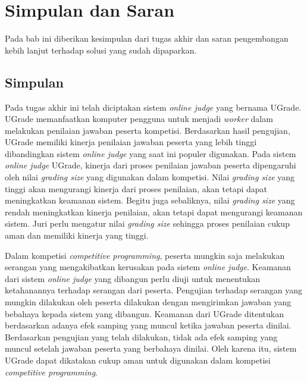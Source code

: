 \chapter{Simpulan dan Saran}


\par Pada bab ini diberikan kesimpulan dari tugas akhir dan saran pengembangan kebih lanjut terhadap solusi yang sudah dipaparkan.

\section{Simpulan}


\par Pada tugas akhir ini telah diciptakan sistem \textit{online judge} yang bernama UGrade. UGrade memanfaatkan komputer pengguna untuk menjadi \textit{worker} dalam melakukan penilaian jawaban peserta kompetisi. Berdasarkan hasil pengujian, UGrade memiliki kinerja penilaian jawaban peserta yang lebih tinggi dibandingkan sistem \textit{online judge} yang saat ini populer digunakan. Pada sistem \textit{online judge} UGrade, kinerja dari proses penilaian jawaban peserta dipengaruhi oleh nilai \textit{grading size} yang digunakan dalam kompetisi. Nilai \textit{grading size} yang tinggi akan mengurangi kinerja dari proses penilaian, akan tetapi dapat meningkatkan keamanan sistem. Begitu juga sebaliknya, nilai \textit{grading size} yang rendah meningkatkan kinerja penilaian, akan tetapi dapat mengurangi keamanan sistem. Juri perlu mengatur nilai \textit{grading size} sehingga proses penilaian cukup aman dan memiliki kinerja yang tinggi.

\par Dalam kompetisi \textit{competitive programming}, peserta mungkin saja melakukan serangan yang mengakibatkan kerusakan pada sistem \textit{online judge}. Keamanan dari sistem \textit{online judge} yang dibangun perlu diuji untuk menentukan ketahanannya terhadap serangan dari peserta. Pengujian terhadap serangan yang mungkin dilakukan oleh peserta dilakukan dengan mengirimkan jawaban yang bebahaya kepada sistem yang dibangun. Keamanan dari UGrade ditentukan berdasarkan adanya efek samping yang muncul ketika jawaban peserta dinilai. Berdasarkan pengujian yang telah dilakukan, tidak ada efek samping yang muncul setelah jawaban peserta yang berbahaya dinilai. Oleh karena itu, sistem UGrade dapat dikatakan cukup aman untuk digunakan dalam kompetisi \textit{competitive programming}.


